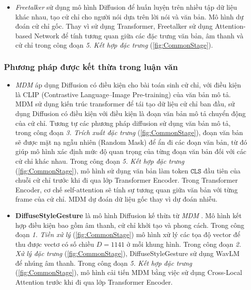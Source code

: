 \begin{itemize}
	\item \textit{Freetalker} \cite{yang2024freetalker} sử dụng mô hình Diffusion để huấn luyện trên nhiều tập dữ liệu khác nhau, tạo cử chỉ cho người nói dựa trên lời nói và văn bản. Mô hình dự đoán cử chỉ gốc. Thay vì sử dụng Transformer, Freetalker sử dụng Attention-based Network để tính tương quan giữa các đặc trưng văn bản, âm thanh và cử chỉ trong công đoạn \textit{5. Kết hợp đặc trưng} (\autoref{fig:CommonStage}).
\end{itemize}


\subsubsection{Phương pháp được kết thừa trong luận văn}

\begin{itemize}
	\item \textit{MDM} \cite{tevet2022human}  áp dụng Diffusion có điều kiện cho bài toán sinh cử chỉ, với điều kiện là CLIP (Contrastive Language–Image Pre-training) của văn bản mô tả. MDM sử dụng kiến trúc transformer để tái tạo dữ liệu cử chỉ ban đầu, sử dụng Diffusion có điều kiện với điều kiện là đoạn văn bản mô tả chuyển động của cử chỉ. Tương tự các phương pháp diffusion sử dụng văn bản mô tả, trong công đoạn \textit{3. Trích xuất đặc trưng} (\autoref{fig:CommonStage}), đoạn văn bản sẽ được mặt nạ ngẫu nhiên (Random Mask) để ẩn đi các đoạn văn bản, từ đó giúp mô hình xác định mức độ quan trọng của từng đoạn văn bản đối với các cử chỉ khác nhau.
	Trong công đoạn \textit{5. Kết hợp đặc trưng} (\autoref{fig:CommonStage}), mô hình sử dụng văn bản làm token $\texttt{CLS}$ đầu tiên của chuỗi cử chỉ trước khi đi qua lớp Transformer Encoder. Trong Transformer Encoder, cơ chế self-attention sẽ tính sự tương quan giữa văn bản với từng frame của cử chỉ. MDM dự đoán dữ liệu gốc thay vì dự đoán nhiễu.
	
	\item \textbf{DiffuseStyleGesture} \cite{yang2023diffusestylegesture} là mô hình Diffusion kế thừa từ \textit{MDM} \cite{tevet2022human}. Mô hình kết hợp điều kiện bao gồm âm thanh, cử chỉ khởi tạo và phong cách. Trong công đoạn \textit{1. Tiền xử lý} (\autoref{fig:CommonStage}) mô hình xử lý các tọa độ vector để thu được vectơ có số chiều $D=1141$ ở mỗi khung hình. Trong công đoạn \textit{2. Xử lý đặc trưng} (\autoref{fig:CommonStage}), DiffuseStyleGesture sử dụng WavLM để nhúng âm thanh. Trong công đoạn \textit{5. Kết hợp đặc trưng} (\autoref{fig:CommonStage}), mô hình cải tiến MDM bằng việc sử dụng Cross-Local Attention trước khi đi qua lớp Transformer Encoder.
\end{itemize}

